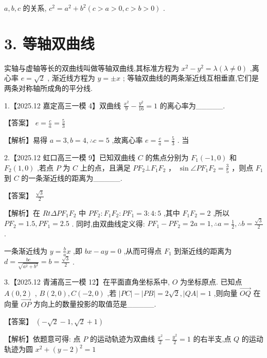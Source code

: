 \documentclass[10pt]{article}
\begin{document}
\(a,b,c\) 的关系, \({c}^{2} = {a}^{2} + {b}^{2}\left( {c > a > 0,c > b > 0}\right)\) .

\section*{3. 等轴双曲线}

实轴与虚轴等长的双曲线叫做等轴双曲线,其标准方程为 \({x}^{2} - {y}^{2} = \lambda \left( {\lambda  \neq  0}\right)\) ,离心率 \(e = \sqrt{2}\) , 渐近线方程为 \(y =  \pm  x\) ; 等轴双曲线的两条渐近线互相垂直,它们是两条对称轴所成角的平分线.

1.【2025.12 嘉定高三一模 4】双曲线 \(\frac{{x}^{2}}{9} - \frac{{y}^{2}}{16} = 1\) 的离心率为\_\_\_\_\_.

【答案】 \(e = \frac{c}{a} = \frac{5}{3}\)

【解析】易得 \(a = 3,b = 4,\therefore c = 5\) ,故离心率 \(e = \frac{c}{a} = \frac{5}{3}\) . 当

2.【2025.12 虹口高三一模 9】已知双曲线 \(C\) 的焦点分别为 \({F}_{1}\left( {-1,0}\right)\) 和 \({F}_{2}\left( {1,0}\right)\) ,若点 \(P\) 为 \(C\) 上的点，且满足 \(P{F}_{2} \bot  {F}_{1}{F}_{2}\) ， \(\sin \angle P{F}_{1}{F}_{2} = \frac{3}{5}\) ，则点 \({F}_{1}\) 到 \(C\) 的一条渐近线的距离为\_\_\_\_\_.

【答案】 \(\frac{\sqrt{3}}{2}\)

【解析】在 \({Rt\Delta P}{F}_{1}{F}_{2}\) 中 \(P{F}_{2} : {F}_{1}{F}_{2} : P{F}_{1} = 3 : 4 : 5\) ,其中 \({F}_{1}{F}_{2} = 2\) ,所以 \(P{F}_{2} = {1.5},P{F}_{1} = {2.5}\) . 同时,由双曲线定义得: \(P{F}_{1} - P{F}_{2} = {2a} = 1,\therefore a = \frac{1}{2},\therefore b = \frac{\sqrt{3}}{2}\) .

一条渐近线为 \(y = \frac{b}{a}x\) ,即 \({bx} - {ay} = 0\) ,从而可得点 \({F}_{1}\) 到渐近线的距离为 \(d = \frac{bc}{\sqrt{{a}^{2} + {b}^{2}}} = b = \frac{\sqrt{3}}{2}\) .

3.【2025.12 青浦高三一模 12】在平面直角坐标系中, \(O\) 为坐标原点. 已知点 \(A\left( {0,2}\right)\) , \(B\left( {2,0}\right) ,C\left( {-2,0}\right)\) ,若 \(\left| {PC}\right|  - \left| {PB}\right|  = 2\sqrt{2},\left| {QA}\right|  = 1\) ,则向量 \(\overrightarrow{OQ}\) 在向量 \(\overrightarrow{OP}\) 方向上的数量投影的取值范是\_\_\_\_\_.

【答案】 \(\left( {-\sqrt{2} - 1,\sqrt{2} + 1}\right)\)

【解析】依题意可得: 点 \(P\) 的运动轨迹为双曲线 \(\frac{{x}^{2}}{2} - \frac{{y}^{2}}{2} = 1\) 的右半支,点 \(Q\) 的运动轨迹为圆 \({x}^{2} + {\left( y - 2\right) }^{2} = 1\)
\end{document}
